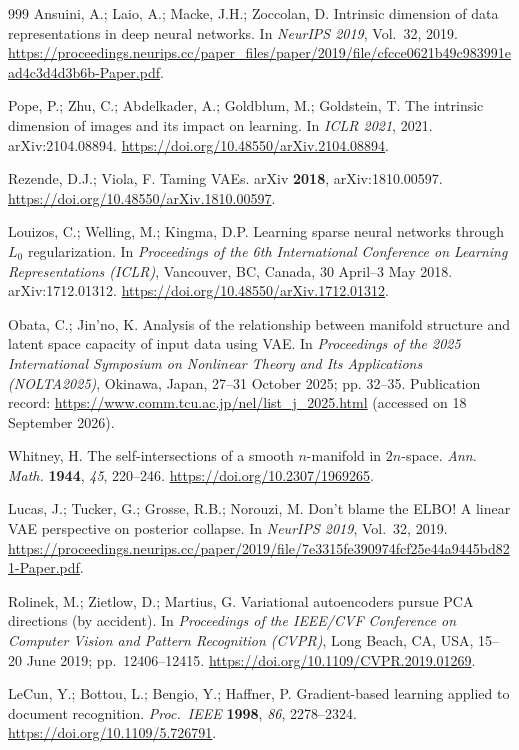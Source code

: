 \documentclass[11pt,a4paper]{ltjsarticle}
\begin{document}
\begin{thebibliography}{999}
Ansuini, A.; Laio, A.; Macke, J.H.; Zoccolan, D.
Intrinsic dimension of data representations in deep neural networks.
In \textit{NeurIPS 2019}, Vol.~32, 2019. \url{https://proceedings.neurips.cc/paper_files/paper/2019/file/cfcce0621b49c983991ead4c3d4d3b6b-Paper.pdf}.

Pope, P.; Zhu, C.; Abdelkader, A.; Goldblum, M.; Goldstein, T.
The intrinsic dimension of images and its impact on learning.
In \textit{ICLR 2021}, 2021. arXiv:2104.08894. \url{https://doi.org/10.48550/arXiv.2104.08894}.

Rezende, D.J.; Viola, F.
Taming VAEs.
arXiv \textbf{2018}, arXiv:1810.00597.
\url{https://doi.org/10.48550/arXiv.1810.00597}.

Louizos, C.; Welling, M.; Kingma, D.P.
Learning sparse neural networks through $L_0$ regularization.
In \textit{Proceedings of the 6th International Conference on Learning
Representations (ICLR)}, Vancouver, BC, Canada, 30 April--3 May 2018.
arXiv:1712.01312. \url{https://doi.org/10.48550/arXiv.1712.01312}.

Obata, C.; Jin'no, K.
Analysis of the relationship between manifold structure and latent space
capacity of input data using VAE.
In \textit{Proceedings of the 2025 International Symposium on Nonlinear
Theory and Its Applications (NOLTA2025)}, Okinawa, Japan, 27--31 October
2025; pp. 32--35.
Publication record: \url{https://www.comm.tcu.ac.jp/nel/list_j_2025.html}
(accessed on 18 September 2026).

Whitney, H.
The self-intersections of a smooth $n$-manifold in $2n$-space.
\textit{Ann. Math.} \textbf{1944}, \textit{45}, 220--246.
\url{https://doi.org/10.2307/1969265}.

Lucas, J.; Tucker, G.; Grosse, R.B.; Norouzi, M.
Don't blame the ELBO! A linear VAE perspective on posterior collapse.
In \textit{NeurIPS 2019}, Vol.~32, 2019. \url{https://proceedings.neurips.cc/paper/2019/file/7e3315fe390974fcf25e44a9445bd821-Paper.pdf}.

Rolinek, M.; Zietlow, D.; Martius, G.
Variational autoencoders pursue PCA directions (by accident).
In \textit{Proceedings of the IEEE/CVF Conference on Computer Vision and
Pattern Recognition (CVPR)}, Long Beach, CA, USA, 15--20 June 2019;
pp.\ 12406--12415. \url{https://doi.org/10.1109/CVPR.2019.01269}.

LeCun, Y.; Bottou, L.; Bengio, Y.; Haffner, P.
Gradient-based learning applied to document recognition.
\textit{Proc.\ IEEE} \textbf{1998}, \textit{86}, 2278--2324.
\url{https://doi.org/10.1109/5.726791}.


\end{thebibliography}
\end{document}
